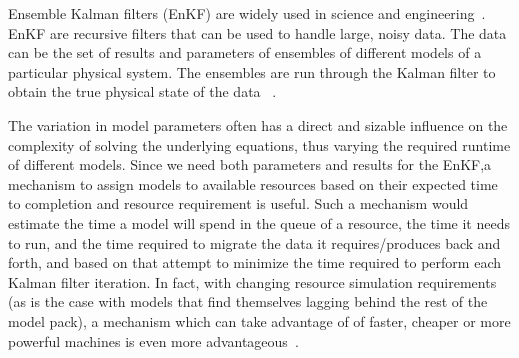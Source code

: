 \documentclass[conference,final]{IEEEtran}
\begin{document}
Ensemble Kalman filters (EnKF) are widely used in science and
engineering~\cite{DataAssim, KalmanPaper, LiEnKF07, DO2007, DO2006}.
EnKF are recursive filters that can be used to handle large, noisy
data. The data can be the set of results and parameters of ensembles
of different models of a particular physical system. The ensembles are
run through the Kalman filter to obtain the true physical state of the
data ~\cite{DataAssim,KalmanPaper}.

The variation in model parameters often has a
direct and sizable influence on the complexity of solving the
underlying equations, thus varying the required runtime of different
models. Since we need both parameters and results for the EnKF,a 
mechanism to assign models to available resources based on
their expected time to completion and resource requirement is useful.
Such a mechanism would estimate the time a model will spend in the
queue of a resource, the time it needs to run, and the time required
to migrate the data it requires/produces back and forth, and based on
that attempt to minimize the time required to perform each Kalman filter iteration.
  In fact, with changing resource simulation
requirements (as is the case with models that find themselves lagging
behind the rest of the model pack), a mechanism which can take
advantage of of faster, cheaper or more powerful machines is even more
advantageous~\cite{escience07}.


\end{document}
